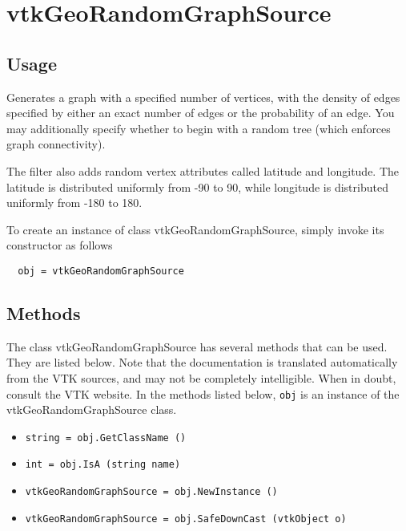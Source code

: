 \section{vtkGeoRandomGraphSource}

\subsection{Usage}

 Generates a graph with a specified number of vertices, with the density of
 edges specified by either an exact number of edges or the probability of
 an edge.  You may additionally specify whether to begin with a random
 tree (which enforces graph connectivity).

 The filter also adds random vertex attributes called latitude and longitude.
 The latitude is distributed uniformly from -90 to 90, while longitude is
 distributed uniformly from -180 to 180.


To create an instance of class vtkGeoRandomGraphSource, simply
invoke its constructor as follows
\begin{verbatim}
  obj = vtkGeoRandomGraphSource
\end{verbatim}
\subsection{Methods}

The class vtkGeoRandomGraphSource has several methods that can be used.
  They are listed below.
Note that the documentation is translated automatically from the VTK sources,
and may not be completely intelligible.  When in doubt, consult the VTK website.
In the methods listed below, \verb|obj| is an instance of the vtkGeoRandomGraphSource class.
\begin{itemize}
\item  \verb|string = obj.GetClassName ()|

\item  \verb|int = obj.IsA (string name)|

\item  \verb|vtkGeoRandomGraphSource = obj.NewInstance ()|

\item  \verb|vtkGeoRandomGraphSource = obj.SafeDownCast (vtkObject o)|

\end{itemize}
